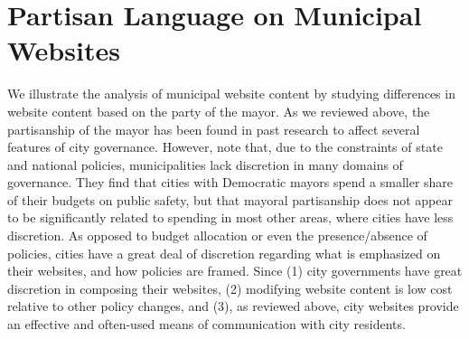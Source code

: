 \documentclass[11pt]{article}
\begin{document}
\section{Partisan Language on Municipal Websites}

We illustrate the analysis of municipal website content by studying differences in website content based on the party of the mayor. As we reviewed above, the partisanship of the mayor has been found in past research to affect several features of city governance. However, \citet{gerber2011mayors} note that, due to the constraints of state and national policies, municipalities lack discretion in many domains of governance. They find that cities with Democratic mayors spend a smaller share of their budgets on public safety, but that mayoral partisanship does not appear to be significantly related to spending in most other areas, where cities have less discretion. As opposed to budget allocation or even the presence/absence of policies, cities have a great deal of discretion regarding what is emphasized on their websites, and how policies are framed. Since (1) city governments have great discretion in composing their websites, (2) modifying website content is low cost relative to other policy changes, and (3), as reviewed above, city websites provide an effective and often-used means of communication with city residents.




\end{document}
